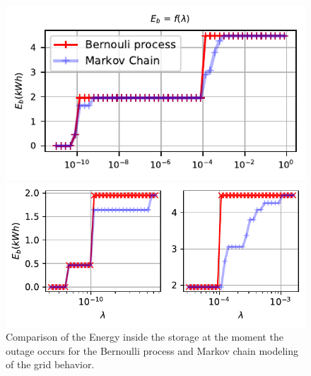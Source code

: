 \documentclass{ifacconf}
\begin{document}
 \begin{figure}[!htb]
        \begin{center}
                \includegraphics[width=0.9\columnwidth]{Figures/Mc_vs_Bp.pdf}
        \end{center}
                \vspace{-8px}

        \begin{center}
                \includegraphics[width=.9\columnwidth]{Figures/Mc_vs_BpZoom.pdf}
        \end{center}
        \vspace{-8px}
        \caption{Comparison of the Energy inside the storage at the moment the outage occurs for the Bernoulli process and  Markov chain modeling of the grid behavior.
        }
        \label{fig:BernouVsMar}
\end{figure} 
\end{document}

